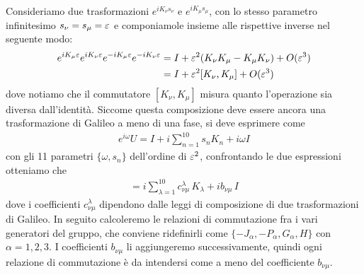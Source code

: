 Consideriamo due trasformazioni $ e^{i K_\nu s_\nu} $ e $ e^{iK_\mu s_\mu} $, con lo stesso parametro infinitesimo $ s_\nu = s_\mu = \varepsilon $ e componiamole 
insieme alle rispettive inverse nel seguente modo:
\begin{align*}
  e^{i K_\mu \varepsilon} e^{i K_\nu \varepsilon} e^{-i K_\mu \varepsilon}e^{-i K_\nu \varepsilon} &= I + \varepsilon^2 (K_\nu K_\mu - K_\mu K_\nu) + O(\varepsilon^3) 
  \\
  &= I + \varepsilon^2 [K_\nu,K_\mu] + O(\varepsilon^3)
\end{align*}
dove notiamo che il commutatore $ [K_\nu, K_\mu] $ misura quanto l'operazione sia diversa dall'identità. Siccome questa composizione deve essere ancora una 
trasformazione di Galileo a meno di una fase, si deve esprimere come 
\begin{align*}
  e^{i\omega} U = I + i \sum_{n = 1}^{10} s_n K_n + i \omega I
\end{align*}
con gli 11 parametri $ \{\omega, s_n\} $ dell'ordine di $ \varepsilon^2 $, confrontando le due espressioni otteniamo che 
\begin{align*}
  [K_\nu, K_\mu] = i \sum_{\lambda = 1}^{10} c_{\nu \mu}^\lambda \,K_\lambda + i b_{\nu \mu} \,I
\end{align*}
dove i coefficienti $ c_{\nu \mu}^\lambda $ dipendono dalle leggi di composizione di due trasformazioni di Galileo. In seguito calcoleremo le relazioni 
di commutazione fra i vari generatori del gruppo, che conviene ridefinirli come $ \{-J_{\alpha} , -P_\alpha, G_\alpha, H\} $ con $ \alpha = 1,2,3 $. 
I coefficienti $ b_{\nu \mu} $ li aggiungeremo successivamente, quindi ogni relazione di commutazione è da intendersi come a meno del coefficiente 
$ b_{\nu \mu} $.

